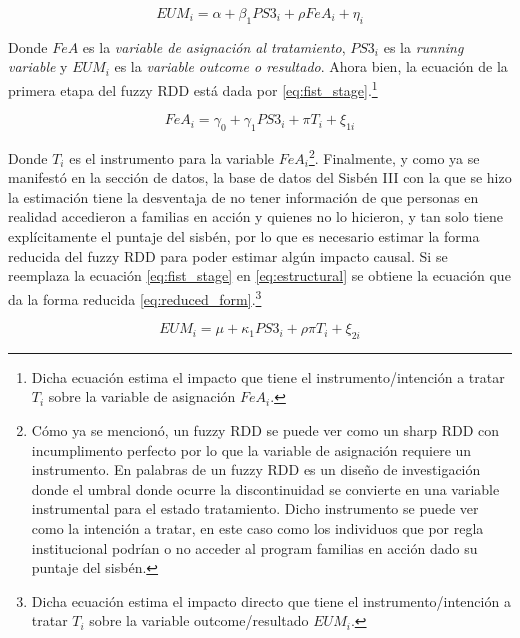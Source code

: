 \documentclass[AER]{AEA}
\begin{document}
\begin{equation}
    EUM_i = \alpha + \beta_1 PS3_i + \rho FeA_i + \eta_i
    \label{eq:estructural}
\end{equation}

Donde $FeA$ es la \textit{variable de asignación al tratamiento}, $PS3_i$ es la \textit{running variable} y $EUM_i$ es la \textit{variable outcome o resultado}. Ahora bien, la ecuación de la primera etapa del fuzzy RDD está dada por \ref{eq:fist_stage}.\footnote{Dicha ecuación estima el impacto que tiene el instrumento/intención a tratar $T_i$ sobre la variable de asignación $FeA_i$.}

\begin{equation}
    FeA_i = \gamma_0 +  \gamma_1 PS3_i + \pi T_i + \xi_{1i}
    \label{eq:fist_stage}
\end{equation}

Donde $T_i$ es el instrumento para la variable $FeA_i$\footnote{Cómo ya se mencionó, un fuzzy RDD se puede ver como un sharp RDD con incumplimento perfecto por lo que la variable de asignación requiere un instrumento. En palabras de \cite{Angrist2008MostlyCompanion} un fuzzy RDD es un diseño de investigación donde el umbral donde ocurre la discontinuidad se convierte en una variable instrumental para el estado tratamiento. Dicho instrumento se puede ver como la intención a tratar, en este caso como los individuos que por regla institucional podrían o no acceder al program familias en acción dado su puntaje del sisbén.}. Finalmente, y como ya se manifestó en la sección de datos, la base de datos del Sisbén III con la que se hizo la estimación tiene la desventaja de no tener información de que personas en realidad accedieron a familias en acción y quienes no lo hicieron, y tan solo tiene explícitamente el puntaje del sisbén, por lo que es necesario estimar la forma reducida del fuzzy RDD para poder estimar algún impacto causal. Si se reemplaza la ecuación \ref{eq:fist_stage} en \ref{eq:estructural} se obtiene la ecuación que da la forma reducida \ref{eq:reduced_form}.\footnote{Dicha ecuación estima el impacto directo que tiene el instrumento/intención a tratar $T_i$ sobre la variable outcome/resultado $EUM_i$.}

\begin{equation}
    EUM_i = \mu + \kappa_1 PS3_i + \rho \pi T_i + \xi_{2i}
    \label{eq:reduced_form}
\end{equation}
\end{document}
